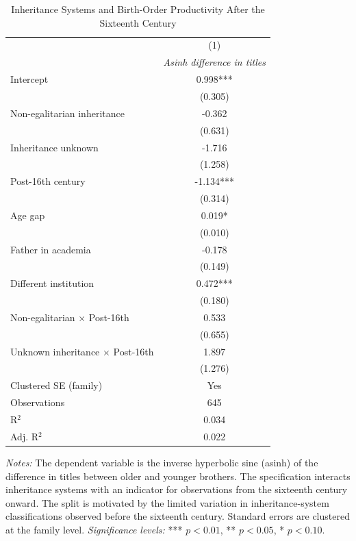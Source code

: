 \begin{table}[H]
\centering
\caption{Inheritance Systems and Birth-Order Productivity After the Sixteenth Century}
\label{tab:inheritance_post15}

\begin{tablebody}
\begin{tabular}{l c}
\toprule
 & (1) \\
 & \textit{Asinh difference in titles} \\
\midrule

Intercept
& 0.998*** \\
& (0.305) \\

Non-egalitarian inheritance
& -0.362 \\
& (0.631) \\

Inheritance unknown
& -1.716 \\
& (1.258) \\

Post-16th century
& -1.134*** \\
& (0.314) \\

Age gap
& 0.019* \\
& (0.010) \\

Father in academia
& -0.178 \\
& (0.149) \\

Different institution
& 0.472*** \\
& (0.180) \\

Non-egalitarian $\times$ Post-16th
& 0.533 \\
& (0.655) \\

Unknown inheritance $\times$ Post-16th
& 1.897 \\
& (1.276) \\

\midrule
Clustered SE (family) & Yes \\
\midrule
Observations & 645 \\
R$^{2}$ & 0.034 \\
Adj. R$^{2}$ & 0.022 \\
\bottomrule
\end{tabular}
\end{tablebody}

\vspace{4pt}
\begin{minipage}{\textwidth}
\footnotesize
\textit{Notes:} The dependent variable is the inverse hyperbolic sine (asinh) of the difference in titles between older and younger brothers. The specification interacts inheritance systems with an indicator for observations from the sixteenth century onward. The split is motivated by the limited variation in inheritance-system classifications observed before the sixteenth century. Standard errors are clustered at the family level. \textit{Significance levels:} *** $p<0.01$, ** $p<0.05$, * $p<0.10$.
\end{minipage}

\end{table}